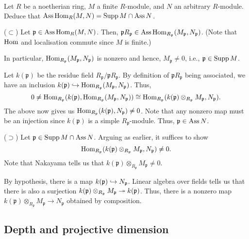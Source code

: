 \documentclass[12pt]{article}
\begin{document}
\begin{exe}
	Let $R$ be a noetherian ring, $M$ a finite $R$-module, and $N$ an arbitrary $R$-module. Deduce that $\operatorname{Ass} \operatorname{Hom}_{R}(M, N) = \operatorname{Supp} M \cap \operatorname{Ass} N$.
\end{exe}
\begin{soln}
	($\subset$) Let $\mathfrak{p} \in \operatorname{Ass} \operatorname{Hom}_{R}(M, N)$. Then, $\mathfrak{p} R_{\mathfrak{p}} \in \operatorname{Ass} \operatorname{Hom}_{R_{\mathfrak{p}}}(M_{\mathfrak{p}}, N_{\mathfrak{p}})$. (Note that $\operatorname{Hom}$ and localisation commute since $M$ is finite.) 

	In particular, $\operatorname{Hom}_{R_{\mathfrak{p}}}(M_{\mathfrak{p}}, N_{\mathfrak{p}})$ is nonzero and hence, $M_{\mathfrak{p}} \neq 0$, i.e., $\mathfrak{p} \in \operatorname{Supp} M$. 

	Let $k(\mathfrak{p})$ be the residue field $R_{\mathfrak{p}}/\mathfrak{p} R_{\mathfrak{p}}$. By definition of $\mathfrak{p} R_{\mathfrak{p}}$ being associated, we have an inclusion $k(\mathfrak{p}) \hookrightarrow \operatorname{Hom}_{R_{\mathfrak{p}}}(M_{\mathfrak{p}}, N_{\mathfrak{p}})$. Thus,
	\begin{equation*} 
		0 \neq \operatorname{Hom}_{R_{\mathfrak{p}}}(k(\mathfrak{p}), \operatorname{Hom}_{R_{\mathfrak{p}}}(M_{\mathfrak{p}}, N_{\mathfrak{p}})) \cong \operatorname{Hom}_{R_{\mathfrak{p}}}(k(\mathfrak{p}) \otimes_{R_{\mathfrak{p}}} M_{\mathfrak{p}}, N_{\mathfrak{p}}).
	\end{equation*}
	The above now gives us $\operatorname{Hom}_{R_{\mathfrak{p}}}(k(\mathfrak{p}), N_{\mathfrak{p}}) \neq 0$. Note that any nonzero map must be an injection since $k(\mathfrak{p})$ is a simple $R_{\mathfrak{p}}$-module. Thus, $\mathfrak{p} \in \operatorname{Ass} N$.

	($\supset$) Let $\mathfrak{p} \in \operatorname{Supp} M \cap \operatorname{Ass} N$. Arguing as earlier, it suffices to show
	\begin{equation*} 
		\operatorname{Hom}_{R_{\mathfrak{p}}}(k(\mathfrak{p}) \otimes_{R_{\mathfrak{p}}} M_{\mathfrak{p}}, N_{\mathfrak{p}}) \neq 0.
	\end{equation*}
	Note that Nakayama tells us that $k(\mathfrak{p}) \otimes_{R_{\mathfrak{p}}} M_{\mathfrak{p}} \neq 0$. 

	By hypothesis, there is a map $k(\mathfrak{p}) \hookrightarrow N_{\mathfrak{p}}$. Linear algebra over fields tells us that there is also a surjection $k(\mathfrak{p}) \otimes_{R_{\mathfrak{p}}} M_{\mathfrak{p}} \twoheadrightarrow k(\mathfrak{p})$. Thus, there is a nonzero map $k(\mathfrak{p}) \otimes_{R_{\mathfrak{p}}} M_{\mathfrak{p}} \to N_{\mathfrak{p}}$ obtained by composition.
\end{soln}

\subsection{Depth and projective dimension}
\end{document}
